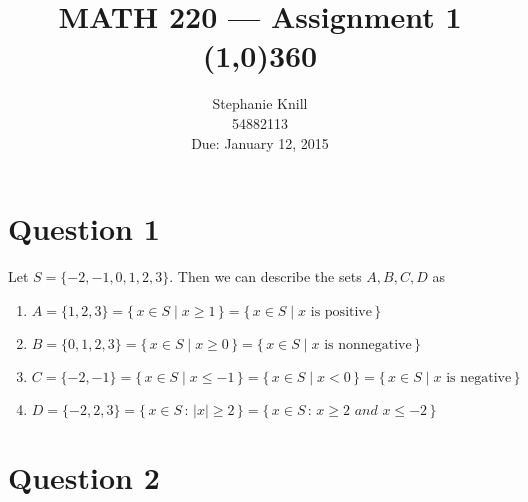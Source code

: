 \documentclass[11pt, oneside]{article}   	%
\begin{document}
\title{MATH 220 --- Assignment 1 \\
\line(1,0){360} \\              %
\vspace{0.2cm}}
\author{
Stephanie Knill \\
54882113 \\
Due: January 12, 2015}

\date{}                   %
\maketitle

\thispagestyle{empty}                   %



\section*{Question 1}

Let $S = \{-2, -1, 0, 1, 2, 3\}$. Then we can describe the sets $A, B, C, D$ as

\begin{enumerate}[ (a)]           
    \item $A = \{1, 2, 3\} = \{\,x \in S \mid x \geq 1 \,\} = \{\,x \in S \mid \text{$x$ is positive} \,\}$       %
    \item $B = \{0, 1, 2, 3\} = \{\,x \in S \mid x \geq 0 \,\} = \{\,x \in S \mid \text{$x$ is nonnegative} \,\}$    
    \item $C = \{-2,-1\} = \{\,x \in S \mid x \leq -1 \,\} = \{\,x \in S \mid x < 0 \,\} = \{\,x \in S \mid \text{$x$ is negative} \,\}$   
    \item $D = \{-2,2,3\} = \{\,x \in S \, : \, |x| \geq 2 \,\} = \{\, x \in S \, : \, x \geq 2$ $and$ $x \leq -2 \, \}$
        
\end{enumerate}


\section*{Question 2}
\end{document}

